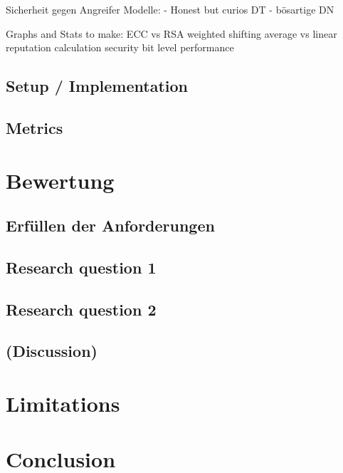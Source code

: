\documentclass[11pt,a4paper]{scrreprt}
\begin{document}
Sicherheit gegen Angreifer Modelle:
    - Honest but curios DT
    - bösartige DN



Graphs and Stats to make:
ECC vs RSA
weighted shifting average vs linear reputation calculation
security bit level performance

\section{Setup / Implementation}

\section{Metrics}



\chapter{Bewertung}

\section{Erfüllen der Anforderungen}

\section{Research question 1}

\section{Research question 2}

\section{(Discussion)}




\chapter{Limitations}




\chapter{Conclusion}
\end{document}
